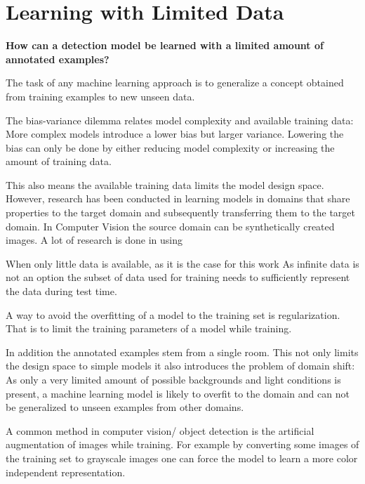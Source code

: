 \chapter{Learning with Limited Data}
\label{sec:training}

\begin{center}
	\textbf{How can a detection model be learned with a limited amount of annotated examples?}
\end{center}


The task of any machine learning approach is to generalize a concept obtained from training examples to new unseen data.

The bias-variance dilemma  relates model complexity and available training data: More complex models introduce a lower bias but larger variance. Lowering the bias can only be done by either reducing model complexity or increasing the amount of training data. 

This also means the available training data limits the model design space. However, research has been conducted in learning models in domains that share properties to the target domain and subsequently transferring them to the target domain. In Computer Vision the source domain can be synthetically created images. A lot of research is done in using


When only little data is available, as it is the case for this work 
As infinite data is not an option the subset of data used for training needs to sufficiently represent the data during test time.

A way to avoid the overfitting of a model to the training set is regularization. That is to limit the training parameters of a model while training.

 In addition the annotated examples stem from a single room. This not only limits the design space to simple models it also introduces the problem of domain shift: As only a very limited amount of possible backgrounds and light conditions is present, a machine learning model is likely to overfit to the domain and can not be generalized to unseen examples from other domains. 

A common method in computer vision/ object detection is the artificial augmentation of images while training. For example by converting some images of the training set to grayscale images one can force the model to learn a more color independent representation.

